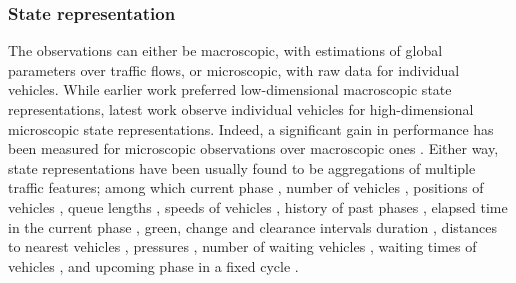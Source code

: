 \documentclass[journal]{IEEEtran}
\begin{document}
\subsubsection{State representation}
The observations can either be macroscopic, with estimations of global parameters over traffic flows, or microscopic, with raw data for individual vehicles. While earlier work preferred low-dimensional macroscopic state representations, latest work observe individual vehicles for high-dimensional microscopic state representations. Indeed, a significant gain in performance has been measured for microscopic observations over macroscopic ones \cite{genders2018evaluating}. Either way, state representations have been usually found to be aggregations of multiple traffic features; among which current phase \cite{genders2019opensource,gao2017adaptative,wei2018intellilight,pol2016coordinated,wei2019presslight,wei2019colight,chen2020toward,zhang2020using,zhang2019partially}, number of vehicles \cite{genders2019opensource,wei2018intellilight,alemzadeh2020adaptative,wei2019colight,zhang2020using,zhang2019partially,genders2018evaluating}, positions of vehicles \cite{gao2017adaptative,liang2019deep,wei2018intellilight,vidali2019deep,pol2016coordinated,genders2018evaluating}, queue lengths \cite{genders2019opensource,li2016traffic,wei2018intellilight,genders2018evaluating,touhbi2017adaptative}, speeds of vehicles \cite{stevens2016reinforcement,gao2017adaptative,liang2019deep,genders2018evaluating}, history of past phases \cite{stevens2016reinforcement,alemzadeh2020adaptative,genders2018evaluating}, elapsed time in the current phase \cite{zhang2020using,zhang2019partially}, green, change and clearance intervals duration \cite{zhang2020using,zhang2019partially}, distances to nearest vehicles \cite{zhang2020using,zhang2019partially}, pressures \cite{wei2019presslight,chen2020toward}, number of waiting vehicles \cite{stevens2016reinforcement}, waiting times of vehicles \cite{wei2018intellilight}, and upcoming phase in a fixed cycle \cite{wei2018intellilight}. \\
\end{document}
